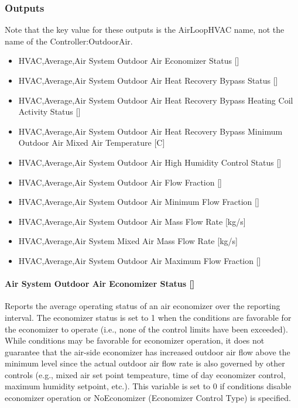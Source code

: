 \subsubsection{Outputs}\label{outputs-005}

Note that the key value for these outputs is the AirLoopHVAC name, not the name of the Controller:OutdoorAir.

\begin{itemize}
\item
  HVAC,Average,Air System Outdoor Air Economizer Status {[]}
\item
  HVAC,Average,Air System Outdoor Air Heat Recovery Bypass Status {[]}
\item
  HVAC,Average,Air System Outdoor Air Heat Recovery Bypass Heating Coil Activity Status {[]}
\item
  HVAC,Average,Air System Outdoor Air Heat Recovery Bypass Minimum Outdoor Air Mixed Air Temperature {[}C{]}
\item
  HVAC,Average,Air System Outdoor Air High Humidity Control Status {[]}
\item
  HVAC,Average,Air System Outdoor Air Flow Fraction {[]}
\item
  HVAC,Average,Air System Outdoor Air Minimum Flow Fraction {[]}
\item
  HVAC,Average,Air System Outdoor Air Mass Flow Rate {[}kg/s{]}
\item
  HVAC,Average,Air System Mixed Air Mass Flow Rate {[}kg/s{]}
\item
  HVAC,Average,Air System Outdoor Air Maximum Flow Fraction {[]}
\end{itemize}

\paragraph{Air System Outdoor Air Economizer Status {[]}}\label{air-system-outdoor-air-economizer-status}

Reports the average operating status of an air economizer over the reporting interval. The economizer status is set to 1 when the conditions are favorable for the economizer to operate (i.e., none of the control limits have been exceeded). While conditions may be favorable for economizer operation, it does not guarantee that the air-side economizer has increased outdoor air flow above the minimum level since the actual outdoor air flow rate is also governed by other controls (e.g., mixed air set point tempeature, time of day economizer control, maximum humidity setpoint, etc.). This variable is set to 0 if conditions disable economizer operation or NoEconomizer (Economizer Control Type) is specified.

